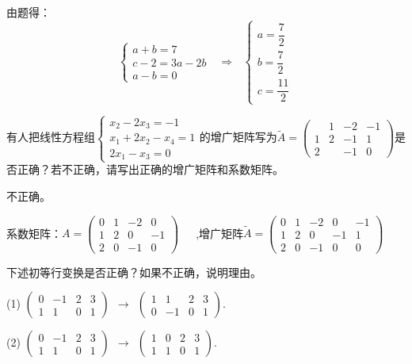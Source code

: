 \documentclass[a4paper]{report}
\begin{document}
\begin{jie}
由题得：
\begin{equation*}
\begin{cases}
a+b=7\\
c-2=3a-2b\\
a-b=0
\end{cases}~~~\Rightarrow~~~
\begin{cases}
a=\dfrac{7}{2}\\[2pt]
b=\dfrac{7}{2}\\[2pt]
c=\dfrac{11}{2}
\end{cases}
\end{equation*}
\end{jie}

\EX 有人把线性方程组$
\begin{cases}
x_2-2x_3=-1\\
x_1+2x_2-x_4=1\\
2x_1-x_3=0
\end{cases}
$的增广矩阵写为$
\widetilde{A} =
\begin{pmatrix}
&1&-2&-1\\ 1 &2 &-1&1\\ 2&&-1&0
\end{pmatrix}
$是否正确？若不正确，请写出正确的增广矩阵和系数矩阵。

\begin{jie}
不正确。

系数矩阵：$
A =
\begin{pmatrix}
0&1&-2&0\\ 1 &2 &0&-1\\ 2&0&-1&0
\end{pmatrix}$~~~,增广矩阵$
\widetilde{A} =
\begin{pmatrix}
0&1&-2&0&-1\\ 1 &2 &0&-1&1\\ 2&0&-1&0&0
\end{pmatrix}$
\end{jie}

\EX 下述初等行变换是否正确？如果不正确，说明理由。

(1)
$
\begin{pmatrix}
0&-1&2&3\\ 1&1 &0&1
\end{pmatrix}~~\rightarrow~~
\begin{pmatrix}
1&1&2&3\\ 0&-1 &0&1
\end{pmatrix}
$.

(2)
$
\begin{pmatrix}
0&-1&2&3\\ 1&1 &0&1
\end{pmatrix}~~\rightarrow~~
\begin{pmatrix}
1&0&2&3\\ 1&1 &0&1
\end{pmatrix}
$.
\end{document}
